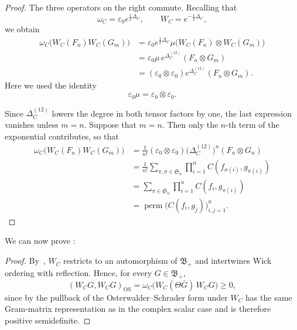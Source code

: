 \documentclass[10pt,a4paper,oneside,reqno]{amsart}
\begin{document}
\begin{appendices}
\begin{proof}
The three operators on the right commute. Recalling that
\begin{equation}
  \omega_C=\varepsilon_0e^{\frac12\Delta_C},
  \qquad
  W_C=e^{-\frac12\Delta_C},  
\end{equation}
we obtain
\begin{align}
  \omega_C\bigl(W_C(F_n)W_C(G_m)\bigr)
  &=
  \varepsilon_0e^{\frac12\Delta_C}
  \mu\bigl(W_C(F_n)\otimes W_C(G_m)\bigr)\\
  &=
  \varepsilon_0\mu\,
  e^{\Delta_C^{(12)}}(F_n\otimes G_m)\\
  &=
  (\varepsilon_0\otimes\varepsilon_0)
  e^{\Delta_C^{(12)}}(F_n\otimes G_m).
\end{align}
Here we used the identity
\begin{equation}
  \varepsilon_0\mu
  =
  \varepsilon_0\otimes\varepsilon_0.
\end{equation}

Since $\Delta_C^{(12)}$ lowers the degree in both tensor factors by
one, the last expression vanishes unless $m=n$. Suppose that $m=n$.
Then only the $n$-th term of the exponential contributes, so that
\begin{align}
  \omega_C\bigl(W_C(F_n)W_C(G_m)\bigr)
  &=
  \frac{1}{n!}
  (\varepsilon_0\otimes\varepsilon_0)
  \bigl(\Delta_C^{(12)}\bigr)^n(F_n\otimes G_n)\\
  &=  \frac{1}{n!}\sum_{\pi, \sigma\in\mathfrak S_n}
  \prod_{i=1}^n C(f_{\sigma(i)},g_{\pi(i)})\\
  &=  \sum_{\pi\in\mathfrak S_n}
  \prod_{i=1}^n C(f_i,g_{\pi(i)})\\
  &=\operatorname{perm}
  \bigl(C(f_i,g_j)\bigr)_{i,j=1}^n.
\end{align}
\end{proof}



We can now prove :
\begin{proof}
By~, $W_C$ restricts to an automorphism of
$\mathfrak B_+$ and intertwines Wick ordering with reflection. Hence,
for every $G\in\mathfrak B_+$,
\begin{equation}
  (W_CG,W_CG)_{\mathrm{OS}}
  =
  \omega_C\bigl(W_C(\Theta\bar G)\,W_CG\bigr)
  \geq0,
\end{equation}
since by  the pullback of the Osterwalder--Schrader form under $W_C$ has the same Gram-matrix representation as in the complex scalar case and is therefore positive semidefinite.


\end{proof}
\end{appendices}
\end{document}
